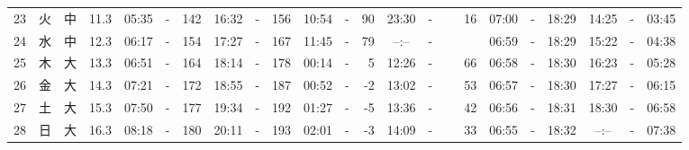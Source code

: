\documentclass[12pt,a4j]{jsarticle}
\begin{document}
\begin{table}[htbp]
\begin{center}
{\begin{tabular}{|rc|cr|ccrccr|ccrccr|ccc|ccc|}
23 & 火 & 中 & 11.3 &  05:35 &-& 142 &  16:32 &-& 156 &  10:54 &-&  90 &  23:30 &-&  16 & 07:00 & -& 18:29 & 14:25 & -& 03:45 \\
24 & 水 & 中 & 12.3 &  06:17 &-& 154 &  17:27 &-& 167 &  11:45 &-&  79 &  --:-- &-&~~~~~ & 06:59 & -& 18:29 & 15:22 & -& 04:38 \\
25 & 木 & 大 & 13.3 &  06:51 &-& 164 &  18:14 &-& 178 &  00:14 &-&   5 &  12:26 &-&  66 & 06:58 & -& 18:30 & 16:23 & -& 05:28 \\
26 & 金 & 大 & 14.3 &  07:21 &-& 172 &  18:55 &-& 187 &  00:52 &-&  -2 &  13:02 &-&  53 & 06:57 & -& 18:30 & 17:27 & -& 06:15 \\
27 & 土 & 大 & 15.3 &  07:50 &-& 177 &  19:34 &-& 192 &  01:27 &-&  -5 &  13:36 &-&  42 & 06:56 & -& 18:31 & 18:30 & -& 06:58 \\
28 & 日 & 大 & 16.3 &  08:18 &-& 180 &  20:11 &-& 193 &  02:01 &-&  -3 &  14:09 &-&  33 & 06:55 & -& 18:32 & --:-- & -& 07:38 \\
   \hline
   \end{tabular}}
   \end{center}
\end{table}
\newpage
\end{document}
